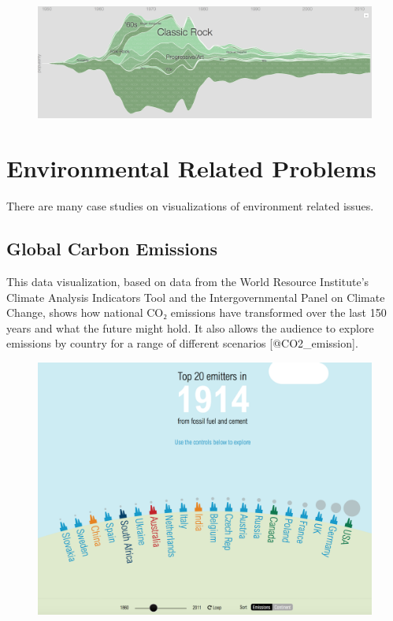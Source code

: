 \documentclass[]{book}
\theoremstyle{definition}
\theoremstyle{definition}
\theoremstyle{definition}
\theoremstyle{remark}
\begin{document}
\begin{figure}
\centering
\includegraphics{images/music_timeline_rock.png}
\caption{}
\end{figure}

\section{Environmental Related
Problems}\label{environmental-related-problems}

There are many case studies on visualizations of environment related
issues.

\subsection{Global Carbon Emissions}\label{global-carbon-emissions}

This data visualization, based on data from the World Resource
Institute's Climate Analysis Indicators Tool and the Intergovernmental
Panel on Climate Change, shows how national CO₂ emissions have
transformed over the last 150 years and what the future might hold. It
also allows the audience to explore emissions by country for a range of
different scenarios {[}@CO2\_emission{]}.

\begin{figure}
\centering
\includegraphics{images/carbon_emissions.png}
\caption{}
\end{figure}
\end{document}
